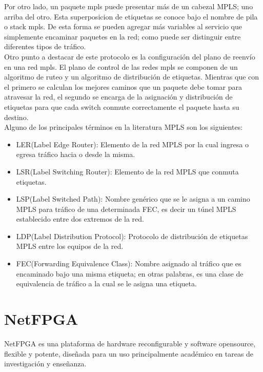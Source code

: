 Por otro lado, un paquete mpls puede presentar más de un cabezal MPLS; uno arriba del otro. Esta superposicion de etiquetas se conoce bajo el nombre de pila o stack mpls. De esta forma se pueden agregar más variables al servicio que simplemente encaminar paquetes en la red; como puede ser distinguir entre diferentes tipos de tráfico.\\

Otro punto a destacar de este protocolo es la configuración del plano de reenvío en una red mpls. El plano de control de las redes mpls se componen de un algoritmo de ruteo y un algoritmo de distribución de etiquetas. Mientras que con el primero se calculan los mejores caminos que un paquete debe tomar para atravesar la red, el segundo se encarga de la asignación y distribución de etiquetas para que cada switch conmute correctamente el paquete hasta su destino.\\

Alguno de los principales términos en la literatura MPLS son los siguientes:

\begin{itemize}
\item LER(Label Edge Router): Elemento de la red MPLS por la cual ingresa o egresa tráfico hacia o desde la misma.
\item LSR(Label Switching Router): Elemento de la red MPLS que conmuta etiquetas.
\item LSP(Label Switched Path): Nombre genérico que se le asigna a un camino MPLS para tráfico de una determinada FEC, es decir un túnel MPLS establecido entre dos extremos de la red.
\item LDP(Label Distribution Protocol): Protocolo de distribución de etiquetas MPLS entre los equipos de la red.
\item FEC(Forwarding Equivalence Class): Nombre asignado al tráfico que es encaminado bajo una misma etiqueta; en otras palabras, es una clase de equivalencia de tráfico a la cual se le asigna una etiqueta.
 
\end{itemize}

\section{NetFPGA}
\label{section2.9}

NetFPGA\cite{NetFPGA1} es una plataforma de hardware reconfigurable y software opensource, flexible y potente, diseñada para un uso principalmente académico en tareas de investigación y enseñanza.\\

